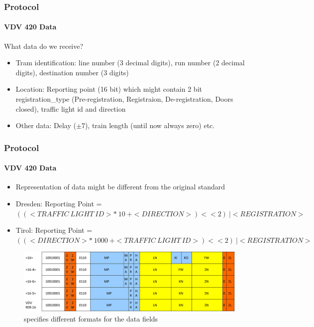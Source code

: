 
\begin{frame}
\frametitle{Protocol}
\framesubtitle{VDV 420 Data}
What data do we receive?
\begin{itemize}
		\item Tram identification: line number (3 decimal digits), run number (2 decimal digits), destination number (3 digits)
		\item Location: Reporting point (16 bit) which might contain 2 bit registration\_type (Pre-registration, Registraion, De-registration, Doors closed), traffic light id and direction
		\item Other data: Delay ($\pm 7$), train length (until now always zero) etc.
\end{itemize}
\end{frame}


\begin{frame}
\frametitle{Protocol}
\framesubtitle{VDV 420 Data}
\begin{itemize}
	\item Representation of data might be different from the original standard
	\item Dresden: Reporting Point = $((<TRAFFIC\ LIGHT\ ID> *\ 10\ + <DIRECTION>) << 2)\ | <REGISTRATION>$
	\item Tirol: Reporting Point = $((<DIRECTION> *\ 1000\ + <TRAFFIC\ LIGHT\ ID>) << 2)\ | <REGISTRATION>$ 
\end{itemize}
\begin{figure}
\centering
\includegraphics[width=.9\textwidth]{figs/vdv426-r09-16-variants.pdf}
\caption{ specifies different formats for the data fields}
\end{figure}
\end{frame}

